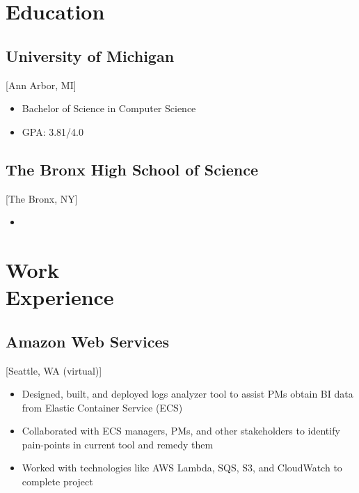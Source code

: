 \documentclass{mycv}
\begin{document}
\maketitle%

\section{Education}

\subsection{University of Michigan}[Ann Arbor, MI]
\vspace{-\parskip}%
\begin{itemize}[label={}]
  \item Bachelor of Science in Computer Science 
  \item GPA: 3.81/4.0
\end{itemize}

\subsection{The Bronx High School of Science}[The Bronx, NY]
\vspace{-\parskip}%
\begin{itemize}[label={}]
  \item {}
\end{itemize}

\section{Work\\Experience}

\subsection{Amazon Web Services}[Seattle, WA (virtual)]
\begin{positions}
\end{positions}
\begin{itemize}
  \item Designed, built, and deployed logs analyzer tool to assist PMs obtain BI data from Elastic Container Service (ECS)
  \item Collaborated with ECS managers, PMs, and other stakeholders to identify pain-points in current tool and remedy them
  \item Worked with technologies like AWS Lambda, SQS, S3, and CloudWatch to complete project
\end{itemize}
\end{document}
